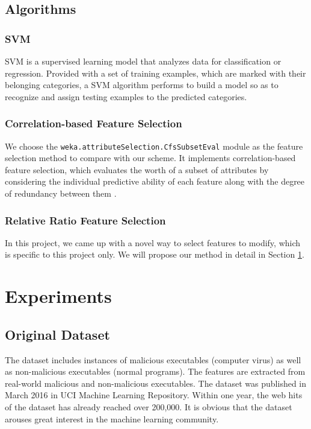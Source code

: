 \documentclass[11pt]{article}
\begin{document}
\subsection{Algorithms}
\subsubsection{SVM}
SVM \cite{cortes1995support} is a supervised learning model that analyzes data for classification or regression. Provided with a set of training examples, which are marked with their belonging categories, a SVM algorithm performs to build a model so as to recognize and assign testing examples to the predicted categories. 

\subsubsection{Correlation-based Feature Selection}
We choose the \texttt{weka.attributeSelection.CfsSubsetEval} module as the feature selection method to compare with our scheme. It implements correlation-based feature selection, which evaluates the worth of a subset of attributes by considering the individual predictive ability of each feature along with the degree of redundancy between them \cite{hall1999correlation}.

\subsubsection{Relative Ratio Feature Selection}
In this project, we came up with a novel way to select features to modify, which is specific to this project only. We will propose our method in detail in Section \ref{sec:exp}.

\section{Experiments}\label{sec:exp}


\subsection{Original Dataset}
The dataset includes instances of malicious executables (computer virus) as well as non-malicious executables (normal programs). The features are extracted from real-world malicious and non-malicious executables. The dataset was published in March 2016 in UCI Machine Learning Repository. Within one year, the web hits of the dataset has already reached over 200,000. It is obvious that the dataset arouses great interest in the machine learning community.
\end{document}
